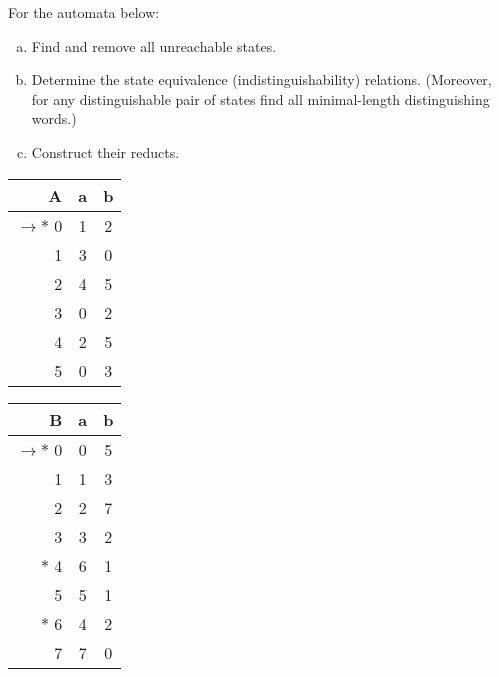 \documentclass[a4paper,12pt]{amsart}
\begin{document}
\medskip\begin{problem}

    For the automata below:

    \begin{enumerate}[(a)]\setlength\itemsep{6pt}
        \item Find and remove all unreachable states.
        \item Determine the state equivalence (indistinguishability) relations. (Moreover, for any distinguishable pair of states find all minimal-length distinguishing words.)
        \item Construct their reducts.        
    \end{enumerate}
    
    \begin{multicols}{2}

        \centering
    
        \begin{tabular}{ r | c c }
            A & a & b \\ \hline
            $\to\ast$ 0 & 1 & 2 \\  
            1 & 3 & 0 \\
            2 & 4 & 5 \\
            3 & 0 & 2 \\
            4 & 2 & 5 \\
            5 & 0 & 3
        \end{tabular}
            
        \begin{tabular}{ r | c c }
            B  & a & b \\ \hline
            $\to\ast$ 0 & 0 & 5 \\  
            1 & 1 & 3 \\
            2 & 2 & 7 \\
            3 & 3 & 2 \\
            $\ast$ 4 & 6 & 1 \\
            5 & 5 & 1 \\
            $\ast$ 6 & 4 & 2 \\
            7 & 7 & 0
        \end{tabular}

    \end{multicols}

\end{problem}
\end{document}
